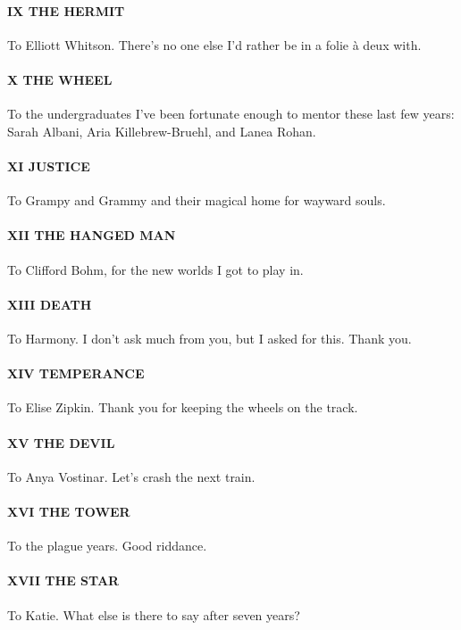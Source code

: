 \paragraph{IX THE HERMIT} To Elliott Whitson. There's no one else I'd rather be in a folie \`a deux with.

\paragraph{X THE WHEEL} To the undergraduates I've been fortunate enough to mentor these last few years: Sarah Albani, Aria Killebrew-Bruehl, and Lanea Rohan.

\paragraph{XI JUSTICE} To Grampy and Grammy and their magical home for wayward souls.

\paragraph{XII THE HANGED MAN} To Clifford Bohm, for the new worlds I got to play in.

\paragraph{XIII DEATH} To Harmony. I don't ask much from you, but I asked for this. Thank you.

\paragraph{XIV TEMPERANCE} To Elise Zipkin. Thank you for keeping the wheels on the track.

\paragraph{XV THE DEVIL} To Anya Vostinar. Let's crash the next train.

\paragraph{XVI THE TOWER} To the plague years. Good riddance.

\paragraph{XVII THE STAR} To Katie. What else is there to say after seven years?

